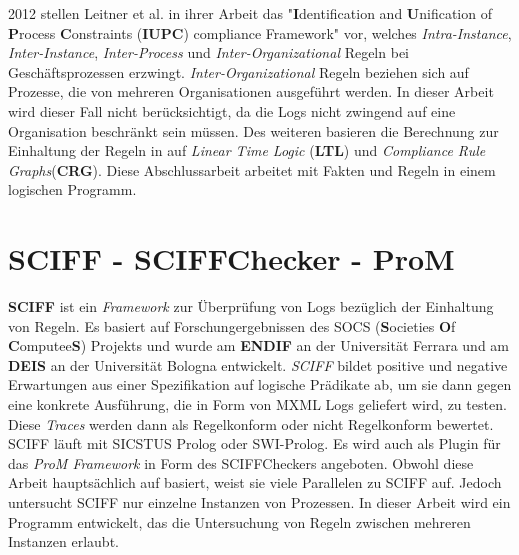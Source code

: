 2012 stellen Leitner et al. in ihrer Arbeit \cite{instance_spanning} das "\textbf{I}dentification and \textbf{U}nification of \textbf{P}rocess \textbf{C}onstraints (\textbf{IUPC}) compliance Framework" vor, welches \textit{Intra-Instance}, \textit{Inter-Instance}, \textit{Inter-Process} und \textit{Inter-Organizational} Regeln bei Geschäftsprozessen erzwingt. \textit{Inter-Organizational} Regeln beziehen sich auf Prozesse, die von mehreren Organisationen ausgeführt werden. In dieser Arbeit wird dieser Fall nicht berücksichtigt, da die Logs nicht zwingend auf eine Organisation beschränkt sein müssen. Des weiteren basieren die Berechnung zur Einhaltung der Regeln in \cite{instance_spanning} auf \textit{Linear Time Logic} (\textbf{LTL}) und \textit{Compliance Rule Graphs}(\textbf{CRG}). Diese Abschlussarbeit arbeitet mit Fakten und Regeln in einem logischen Programm.


\section{SCIFF - SCIFFChecker - ProM}
\textbf{SCIFF} ist ein \textit{Framework} zur Überprüfung von  Logs bezüglich der Einhaltung von Regeln. Es basiert auf Forschungergebnissen des SOCS (\textbf{S}ocieties \textbf{O}f \textbf{C}omputee\textbf{S}) Projekts und wurde am \textbf{ENDIF} an der Universität Ferrara und am \textbf{DEIS} an der Universität Bologna entwickelt. \textit{SCIFF} bildet positive und negative Erwartungen aus einer Spezifikation auf logische Prädikate ab, um sie dann gegen eine konkrete Ausführung, die in Form von MXML Logs geliefert wird, zu testen. Diese \textit{Traces} werden dann als Regelkonform oder nicht Regelkonform bewertet. SCIFF läuft mit SICSTUS Prolog oder SWI-Prolog. Es wird auch als Plugin für das \textit{ProM Framework} in Form des SCIFFCheckers angeboten. Obwohl diese Arbeit hauptsächlich auf \cite{warner_inter_instance} basiert, weist sie viele Parallelen zu SCIFF auf. Jedoch untersucht SCIFF nur einzelne Instanzen von Prozessen. In dieser Arbeit wird ein Programm entwickelt, das die Untersuchung von Regeln zwischen mehreren Instanzen erlaubt. 
\cite{SCIFF} \cite{SCIFFPaper}\cite{SCIFF3}

